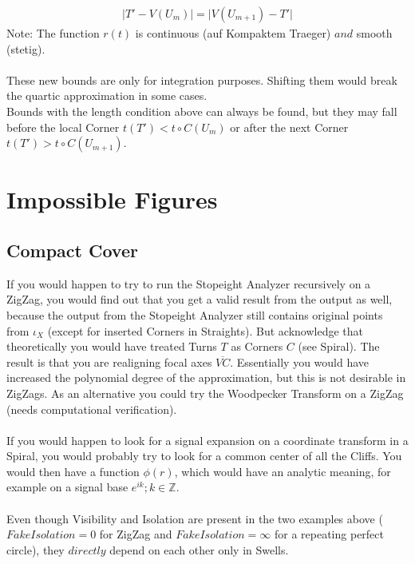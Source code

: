 \documentclass{report}
\begin{document}
\begin{align}
\lvert T' - V(U_{m}) \rvert = \lvert V(U_{m+1}) -T' \rvert\label{eq:2}
\end{align}
Note: The function $r(t)$ is continuous (auf Kompaktem Traeger) $and$ smooth (stetig).\\\\
These new bounds are only for integration purposes. Shifting them would break the quartic approximation in some cases.\\
Bounds with the length condition above can always be found, but they may fall before the local Corner $t(T') < t\circ C(U_{m})$ or after the next Corner $t(T') > t\circ C(U_{m+1})$.  

\section{Impossible Figures}

\subsection*{Compact Cover}

If you would happen to try to run the Stopeight Analyzer recursively on a ZigZag, you would find out that you get a valid result from the output as well, because the output from the Stopeight Analyzer still contains original points from $\iota_{X}$ (except for inserted Corners in Straights). But acknowledge that theoretically you would have treated Turns $T$ as Corners $C$ (see Spiral). The result is that you are realigning focal axes $\overline{VC}$. Essentially you would have increased the polynomial degree of the approximation, but this is not desirable in ZigZags. As an alternative you could try the Woodpecker Transform \cite{Woodpecker} on a ZigZag (needs computational verification).\\\\
If you would happen to look for a signal expansion on a coordinate transform in a Spiral, you would probably try to look for a common center of all the Cliffs. You would then have a function $\phi (r)$, which would have an analytic meaning, for example on a signal base $e^{ik};k \in \mathbb{Z}$.\\\\
Even though Visibility and Isolation are present in the two examples above ($Fake Isolation=0$ for ZigZag and $Fake Isolation=\infty$ for a repeating perfect circle), they $directly$ depend on each other only in Swells.
\end{document}
